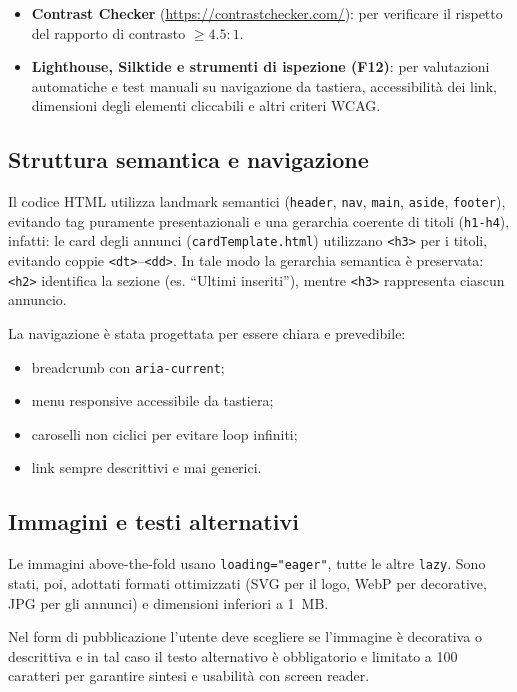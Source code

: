 \documentclass[a4paper,12pt]{article}
\begin{document}
\begin{itemize}
    \item \textbf{Contrast Checker} (\underline{\url{https://contrastchecker.com/}}): per verificare il rispetto del rapporto di contrasto $\geq 4.5\!:\!1$.
    \item \textbf{Lighthouse, Silktide e strumenti di ispezione (F12)}: per valutazioni automatiche e test manuali su navigazione da tastiera, accessibilità dei link, dimensioni degli elementi cliccabili e altri criteri WCAG.
\end{itemize}

\subsection{Struttura semantica e navigazione}

Il codice HTML utilizza landmark semantici (\texttt{header}, \texttt{nav}, \texttt{main}, 
\texttt{aside}, \texttt{footer}), evitando tag puramente presentazionali e una gerarchia coerente di titoli (\texttt{h1-h4}), infatti: le card degli annunci (\texttt{cardTemplate.html}) utilizzano \texttt{<h3>} per i titoli, evitando coppie \texttt{<dt>}–\texttt{<dd>}.  
In tale modo la gerarchia semantica è preservata: \texttt{<h2>} identifica la sezione (es. “Ultimi inseriti”), mentre \texttt{<h3>} rappresenta ciascun annuncio. 

La navigazione è stata progettata per essere chiara e prevedibile:
\begin{itemize}
    \item breadcrumb con \texttt{aria-current};
    \item menu responsive accessibile da tastiera;
    \item caroselli non ciclici per evitare loop infiniti;
    \item link sempre descrittivi e mai generici.
\end{itemize}

\subsection{Immagini e testi alternativi}

Le immagini above-the-fold usano \texttt{loading="eager"}, tutte le altre \texttt{lazy}.  
Sono stati, poi, adottati formati ottimizzati (SVG per il logo, WebP per decorative, JPG per gli annunci) 
e dimensioni inferiori a 1~MB.

Nel form di pubblicazione l’utente deve scegliere se l’immagine è decorativa o descrittiva e in tal caso il testo alternativo è obbligatorio e limitato a 100 caratteri per garantire sintesi e usabilità con screen reader.  
\end{document}
